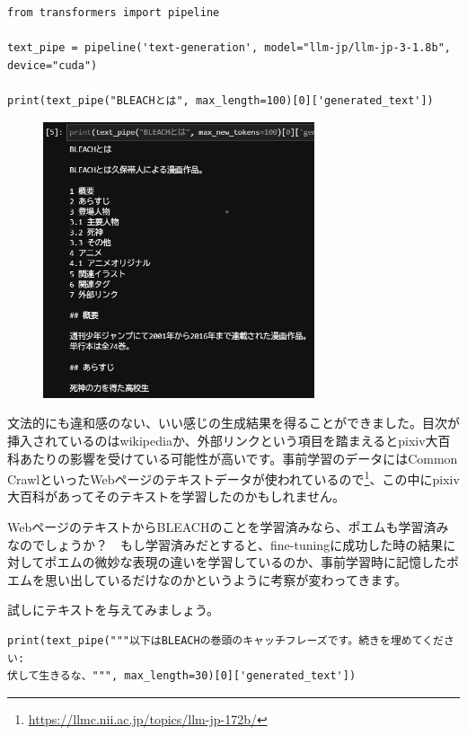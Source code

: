 \documentclass[a5paper,twoside,dvipdfmx]{jsarticle}
\begin{document}
\begin{lstlisting}
from transformers import pipeline

text_pipe = pipeline('text-generation', model="llm-jp/llm-jp-3-1.8b", device="cuda")

print(text_pipe("BLEACHとは", max_length=100)[0]['generated_text'])
\end{lstlisting}

\begin{figure}[h]
  \centering
  \includegraphics[width=80mm]{../C105Fig/gray/generate.png}
 \end{figure} 

\newpage

文法的にも違和感のない、いい感じの生成結果を得ることができました。目次が挿入されているのはwikipediaか、外部リンクという項目を踏まえるとpixiv大百科あたりの影響を受けている可能性が高いです。事前学習のデータにはCommon CrawlといったWebページのテキストデータが使われているので\footnote{\url{https://llmc.nii.ac.jp/topics/llm-jp-172b/}}、この中にpixiv大百科があってそのテキストを学習したのかもしれません。

WebページのテキストからBLEACHのことを学習済みなら、ポエムも学習済みなのでしょうか？　もし学習済みだとすると、fine-tuningに成功した時の結果に対してポエムの微妙な表現の違いを学習しているのか、事前学習時に記憶したポエムを思い出しているだけなのかというように考察が変わってきます。

試しにテキストを与えてみましょう。

\begin{lstlisting}
print(text_pipe("""以下はBLEACHの巻頭のキャッチフレーズです。続きを埋めてください: 
伏して生きるな、""", max_length=30)[0]['generated_text'])
\end{lstlisting}
\end{document}
